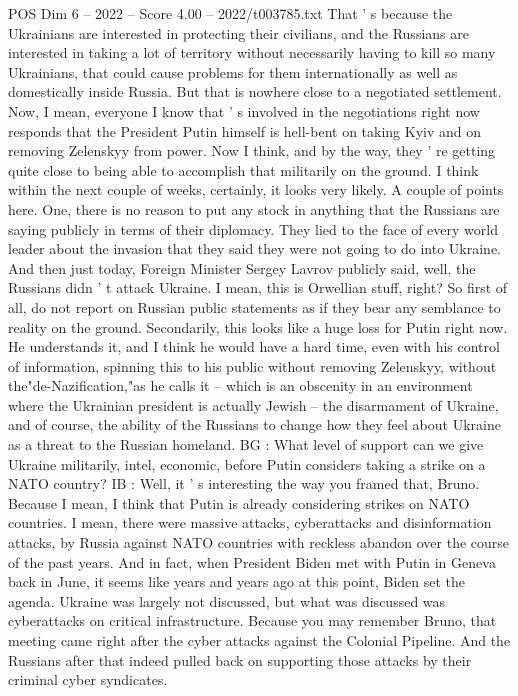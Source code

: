 \begin{textsample}{POS Dim 6 – 2022 – Score 4.00 – 2022/t003785.txt}
That ' s because the Ukrainians are interested in protecting their civilians, and the Russians are interested in taking a lot of territory without necessarily having to kill so many Ukrainians, that could cause problems for them internationally as well as domestically inside Russia.
But that is nowhere close to a negotiated settlement.
Now, I mean, everyone I know that ' s involved in the negotiations right now responds that the President Putin himself is hell-bent on taking Kyiv and on removing Zelenskyy from power.
Now I think, and by the way, they ' re getting quite close to being able to accomplish that militarily on the ground.
I think within the next couple of weeks, certainly, it looks very likely.
A couple of points here.
One, there is no reason to put any stock in anything that the Russians are saying publicly in terms of their diplomacy.
They lied to the face of every world leader about the invasion that they said they were not going to do into Ukraine.
And then just today, Foreign Minister Sergey Lavrov publicly said, well, the Russians didn ' t attack Ukraine.
I mean, this is Orwellian stuff, right?
So first of all, do not report on Russian public statements as if they bear any semblance to reality on the ground.
Secondarily, this looks like a huge loss for Putin right now.
He understands it, and I think he would have a hard time, even with his control of information, spinning this to his public without removing Zelenskyy, without the"de-Nazification,"as he calls it -- which is an obscenity in an environment where the Ukrainian president is actually Jewish -- the disarmament of Ukraine, and of course, the ability of the Russians to change how they feel about Ukraine as a threat to the Russian homeland.
BG : What level of support can we give Ukraine militarily, intel, economic, before Putin considers taking a strike on a NATO country?
IB : Well, it ' s interesting the way you framed that, Bruno.
Because I mean, I think that Putin is already considering strikes on NATO countries.
I mean, there were massive attacks, cyberattacks and disinformation attacks, by Russia against NATO countries with reckless abandon over the course of the past years.
And in fact, when President Biden met with Putin in Geneva back in June, it seems like years and years ago at this point, Biden set the agenda.
Ukraine was largely not discussed, but what was discussed was cyberattacks on critical infrastructure.
Because you may remember Bruno, that meeting came right after the cyber attacks against the Colonial Pipeline.
And the Russians after that indeed pulled back on supporting those attacks by their criminal cyber syndicates.

\end{textsample}
